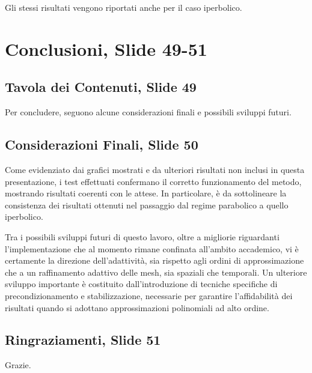 \documentclass[12pt]{article}
\begin{document}
    Gli stessi risultati vengono riportati anche per il caso iperbolico.

    \newpage
    \section{Conclusioni, Slide 49-51}

    \subsection{Tavola dei Contenuti, Slide 49}

    Per concludere, seguono alcune considerazioni finali e possibili sviluppi futuri.

    \subsection{Considerazioni Finali, Slide 50}

    Come evidenziato dai grafici mostrati e da ulteriori risultati non inclusi in questa presentazione, i test effettuati confermano il corretto funzionamento del metodo, mostrando risultati coerenti con le attese. In particolare, è da sottolineare la consistenza dei risultati ottenuti nel passaggio dal regime parabolico a quello iperbolico.

    Tra i possibili sviluppi futuri di questo lavoro, oltre a migliorie riguardanti l'implementazione che al momento rimane confinata all'ambito accademico, vi è certamente la direzione dell'adattività, sia rispetto agli ordini di approssimazione che a un raffinamento adattivo delle mesh, sia spaziali che temporali. Un ulteriore sviluppo importante è costituito dall'introduzione di tecniche specifiche di precondizionamento e stabilizzazione, necessarie per garantire l'affidabilità dei risultati quando si adottano approssimazioni polinomiali ad alto ordine.

    \subsection{Ringraziamenti, Slide 51}

    Grazie.
\end{document}
